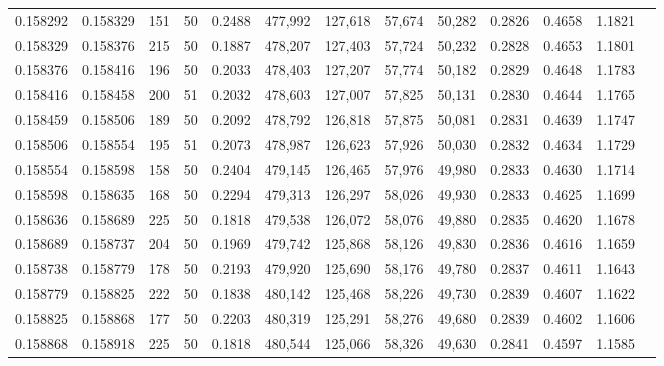 \begin{tabular}{rrrrrrrrrrrrr}
0.158292 & 0.158329 &   151 &  50 &                                     0.2488 & 477,992 & 127,618 &  57,674 &  50,282 & 0.2826 & 0.4658 & 1.1821 \\
0.158329 & 0.158376 &   215 &  50 &                                     0.1887 & 478,207 & 127,403 &  57,724 &  50,232 & 0.2828 & 0.4653 & 1.1801 \\
0.158376 & 0.158416 &   196 &  50 &                                     0.2033 & 478,403 & 127,207 &  57,774 &  50,182 & 0.2829 & 0.4648 & 1.1783 \\
0.158416 & 0.158458 &   200 &  51 &                                     0.2032 & 478,603 & 127,007 &  57,825 &  50,131 & 0.2830 & 0.4644 & 1.1765 \\
0.158459 & 0.158506 &   189 &  50 &                                     0.2092 & 478,792 & 126,818 &  57,875 &  50,081 & 0.2831 & 0.4639 & 1.1747 \\
0.158506 & 0.158554 &   195 &  51 &                                     0.2073 & 478,987 & 126,623 &  57,926 &  50,030 & 0.2832 & 0.4634 & 1.1729 \\
0.158554 & 0.158598 &   158 &  50 &                                     0.2404 & 479,145 & 126,465 &  57,976 &  49,980 & 0.2833 & 0.4630 & 1.1714 \\
0.158598 & 0.158635 &   168 &  50 &                                     0.2294 & 479,313 & 126,297 &  58,026 &  49,930 & 0.2833 & 0.4625 & 1.1699 \\
0.158636 & 0.158689 &   225 &  50 &                                     0.1818 & 479,538 & 126,072 &  58,076 &  49,880 & 0.2835 & 0.4620 & 1.1678 \\
0.158689 & 0.158737 &   204 &  50 &                                     0.1969 & 479,742 & 125,868 &  58,126 &  49,830 & 0.2836 & 0.4616 & 1.1659 \\
0.158738 & 0.158779 &   178 &  50 &                                     0.2193 & 479,920 & 125,690 &  58,176 &  49,780 & 0.2837 & 0.4611 & 1.1643 \\
0.158779 & 0.158825 &   222 &  50 &                                     0.1838 & 480,142 & 125,468 &  58,226 &  49,730 & 0.2839 & 0.4607 & 1.1622 \\
0.158825 & 0.158868 &   177 &  50 &                                     0.2203 & 480,319 & 125,291 &  58,276 &  49,680 & 0.2839 & 0.4602 & 1.1606 \\
0.158868 & 0.158918 &   225 &  50 &                                     0.1818 & 480,544 & 125,066 &  58,326 &  49,630 & 0.2841 & 0.4597 & 1.1585 \\

\end{tabular}

